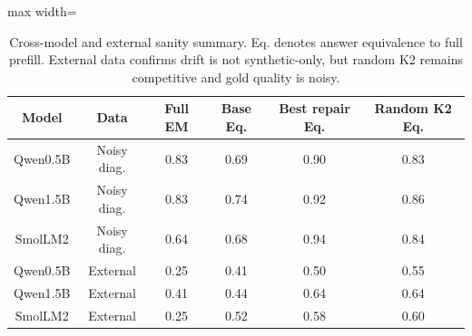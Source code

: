 \begin{table}[t]
\centering
\footnotesize
\begin{adjustbox}{max width=\textwidth}
\begin{tabular}{cccccc}
\toprule
Model & Data & Full EM & Base Eq. & Best repair Eq. & Random K2 Eq. \\
\midrule
Qwen0.5B & Noisy diag. & 0.83 & 0.69 & 0.90 & 0.83 \\
Qwen1.5B & Noisy diag. & 0.83 & 0.74 & 0.92 & 0.86 \\
SmolLM2 & Noisy diag. & 0.64 & 0.68 & 0.94 & 0.84 \\
Qwen0.5B & External & 0.25 & 0.41 & 0.50 & 0.55 \\
Qwen1.5B & External & 0.41 & 0.44 & 0.64 & 0.64 \\
SmolLM2 & External & 0.25 & 0.52 & 0.58 & 0.60 \\
\bottomrule
\end{tabular}
\end{adjustbox}
\caption{Cross-model and external sanity summary. Eq. denotes answer equivalence to full prefill. External data confirms drift is not synthetic-only, but random K2 remains competitive and gold quality is noisy.}
\label{tab:cross-external}
\end{table}
